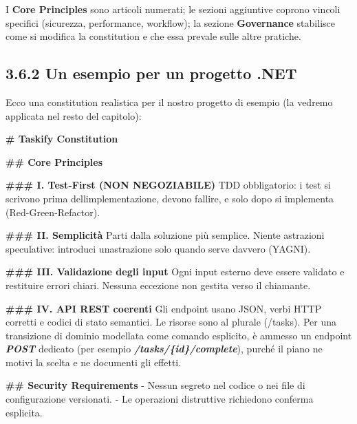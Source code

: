 \documentclass[
  italian,
  10pt,
]{book}
\newenvironment{Shaded}{\begin{snugshade}}{\end{snugshade}}
\newcommand{\FunctionTok}[1]{\textcolor[rgb]{0.13,0.29,0.53}{\textbf{#1}}}
\newcommand{\InformationTok}[1]{\textcolor[rgb]{0.56,0.35,0.01}{\textbf{\textit{#1}}}}
\newcommand{\NormalTok}[1]{#1}
\newcommand{\SpecialStringTok}[1]{\textcolor[rgb]{0.31,0.60,0.02}{#1}}
\begin{document}
I \textbf{Core Principles} sono articoli numerati; le sezioni aggiuntive
coprono vincoli specifici (sicurezza, performance, workflow); la sezione
\textbf{Governance} stabilisce come si modifica la constitution e che
essa prevale sulle altre pratiche.

\subsection{3.6.2 Un esempio per un progetto
.NET}\label{un-esempio-per-un-progetto-.net}

Ecco una constitution realistica per il nostro progetto di esempio (la
vedremo applicata nel resto del capitolo):

\begin{Shaded}
\begin{Highlighting}[]
\FunctionTok{\# Taskify Constitution}

\FunctionTok{\#\# Core Principles}

\FunctionTok{\#\#\# I. Test{-}First (NON NEGOZIABILE)}
\NormalTok{TDD obbligatorio: i test si scrivono prima dell\textquotesingle{}implementazione,}
\NormalTok{devono fallire, e solo dopo si implementa (Red{-}Green{-}Refactor).}

\FunctionTok{\#\#\# II. Semplicità}
\NormalTok{Parti dalla soluzione più semplice. Niente astrazioni speculative:}
\NormalTok{introduci un\textquotesingle{}astrazione solo quando serve davvero (YAGNI).}

\FunctionTok{\#\#\# III. Validazione degli input}
\NormalTok{Ogni input esterno deve essere validato e restituire errori chiari.}
\NormalTok{Nessuna eccezione non gestita verso il chiamante.}

\FunctionTok{\#\#\# IV. API REST coerenti}
\NormalTok{Gli endpoint usano JSON, verbi HTTP corretti e codici di stato}
\NormalTok{semantici. Le risorse sono al plurale (/tasks).}
\NormalTok{Per una transizione di dominio modellata come comando esplicito, è}
\NormalTok{ammesso un endpoint }\InformationTok{\textasciigrave{}POST\textasciigrave{}}\NormalTok{ dedicato (per esempio }\InformationTok{\textasciigrave{}/tasks/\{id\}/complete\textasciigrave{}}\NormalTok{),}
\NormalTok{purché il piano ne motivi la scelta e ne documenti gli effetti.}

\FunctionTok{\#\# Security Requirements}
\SpecialStringTok{{-} }\NormalTok{Nessun segreto nel codice o nei file di configurazione versionati.}
\SpecialStringTok{{-} }\NormalTok{Le operazioni distruttive richiedono conferma esplicita.}


\end{Highlighting}
\end{Shaded}
\end{document}
